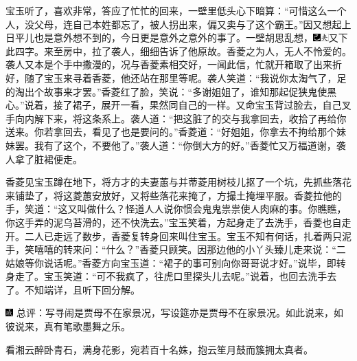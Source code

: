 宝玉听了，喜欢非常，答应了忙忙的回来，一壁里低头心下暗算：``可惜这么一个人，没父母，连自己本姓都忘了，被人拐出来，偏又卖与了这个霸王。''因又想起上日平儿也是意外想不到的，今日更是意外之意外的事了。一壁胡思乱想，{\includegraphics[width=3mm]{../Images/00003}\includegraphics[width=3mm]{../Images/00012}\footnotesize \kaishu 又下此四字。}来至房中，拉了袭人，细细告诉了他原故。香菱之为人，无人不怜爱的。袭人又本是个手中撒漫的，况与香菱素相交好，一闻此信，忙就开箱取了出来折好，随了宝玉来寻着香菱，他还站在那里等呢。袭人笑道：``我说你太淘气了，足的淘出个故事来才罢。''香菱红了脸，笑说：``多谢姐姐了，谁知那起促狭鬼使黑心。''说着，接了裙子，展开一看，果然同自己的一样。又命宝玉背过脸去，自己叉手向内解下来，将这条系上。袭人道：``把这脏了的交与我拿回去，收拾了再给你送来。你若拿回去，看见了也是要问的。''香菱道：``好姐姐，你拿去不拘给那个妹妹罢。我有了这个，不要他了。''袭人道：``你倒大方的好。''香菱忙又万福道谢，袭人拿了脏裙便走。

香菱见宝玉蹲在地下，将方才的夫妻蕙与并蒂菱用树枝儿抠了一个坑，先抓些落花来铺垫了，将这菱蕙安放好，又将些落花来掩了，方撮土掩埋平服。香菱拉他的手，笑道：``这又叫做什么？怪道人人说你惯会鬼鬼祟祟使人肉麻的事。你瞧瞧，你这手弄的泥乌苔滑的，还不快洗去。''宝玉笑着，方起身走了去洗手，香菱也自走开。二人已走远了数步，香菱复转身回来叫住宝玉。宝玉不知有何话，扎着两只泥手，笑嘻嘻的转来问：``什么？''香菱只顾笑。因那边他的小丫头臻儿走来说：``二姑娘等你说话呢。''香菱方向宝玉道：``裙子的事可别向你哥哥说才好。''说毕，即转身走了。宝玉笑道：``可不我疯了，往虎口里探头儿去呢。''说着，也回去洗手去了。不知端详，且听下回分解。

{\includegraphics[width=3mm]{../Images/00005} \kaishu 总评：写寻闹是贾母不在家景况，写设筵亦是贾母不在家景况。如此说来，如彼说来，真有笔歌墨舞之乐。}

{看湘云醉卧青石，满身花影，宛若百十名姝，抱云笙月鼓而簇拥太真者。}

